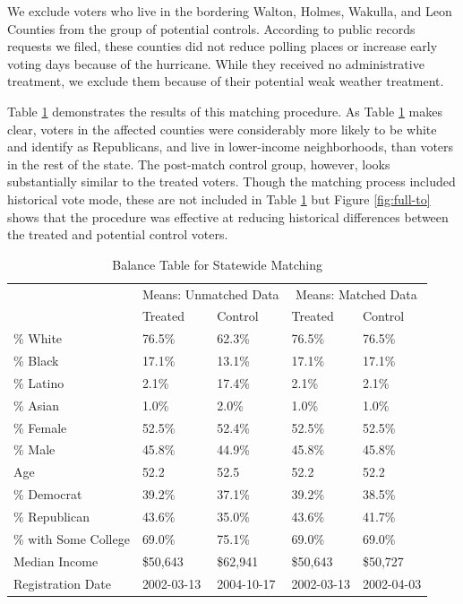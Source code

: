 \documentclass[
  12pt,
]{article}
\begin{document}
We exclude voters who live in the bordering Walton, Holmes, Wakulla, and Leon Counties from the group of potential controls. According to public records requests we filed, these counties did not reduce polling places or increase early voting days because of the hurricane. While they received no administrative treatment, we exclude them because of their potential weak weather treatment.

Table \ref{tab:full-bal} demonstrates the results of this matching procedure. As Table \ref{tab:full-bal} makes clear, voters in the affected counties were considerably more likely to be white and identify as Republicans, and live in lower-income neighborhoods, than voters in the rest of the state. The post-match control group, however, looks substantially similar to the treated voters. Though the matching process included historical vote mode, these are not included in Table \ref{tab:full-bal} but Figure \ref{fig:full-to} shows that the procedure was effective at reducing historical differences between the treated and potential control voters.

\begin{singlespace}
\begin{table}[!h]

\caption{\label{tab:balance-tab-full}\label{tab:full-bal} Balance Table for Statewide Matching}
\centering
\begin{tabular}[t]{lllll}
\toprule
\multicolumn{1}{c}{ } & \multicolumn{2}{c}{Means: Unmatched Data} & \multicolumn{2}{c}{Means: Matched Data} \\
\cmidrule(l{3pt}r{3pt}){2-3} \cmidrule(l{3pt}r{3pt}){4-5}
 & Treated & Control & Treated & Control\\
\midrule
\% White & 76.5\% & 62.3\% & 76.5\% & 76.5\%\\
\% Black & 17.1\% & 13.1\% & 17.1\% & 17.1\%\\
\% Latino & 2.1\% & 17.4\% & 2.1\% & 2.1\%\\
\% Asian & 1.0\% & 2.0\% & 1.0\% & 1.0\%\\
\% Female & 52.5\% & 52.4\% & 52.5\% & 52.5\%\\
\% Male & 45.8\% & 44.9\% & 45.8\% & 45.8\%\\
Age & 52.2 & 52.5 & 52.2 & 52.2\\
\% Democrat & 39.2\% & 37.1\% & 39.2\% & 38.5\%\\
\% Republican & 43.6\% & 35.0\% & 43.6\% & 41.7\%\\
\% with Some College & 69.0\% & 75.1\% & 69.0\% & 69.0\%\\
Median Income & \$50,643 & \$62,941 & \$50,643 & \$50,727\\
Registration Date & 2002-03-13 & 2004-10-17 & 2002-03-13 & 2002-04-03\\
\bottomrule
\end{tabular}
\end{table}
\end{singlespace}
\end{document}

